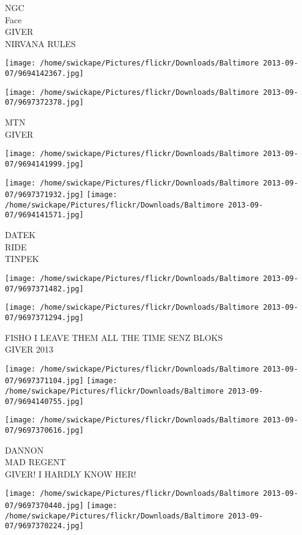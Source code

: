 \documentclass[10pt,letterpaper]{article}
\begin{document}
NGC\\
Face\\
GIVER\\
NIRVANA RULES
\pagebreak

\texttt{[image: /home/swickape/Pictures/flickr/Downloads/Baltimore 2013-09-07/9694142367.jpg]}

\vspace{0.25in}
\texttt{[image: /home/swickape/Pictures/flickr/Downloads/Baltimore 2013-09-07/9697372378.jpg]}

MTN\\
GIVER
\pagebreak

\texttt{[image: /home/swickape/Pictures/flickr/Downloads/Baltimore 2013-09-07/9694141999.jpg]}

\vspace{0.25in}
\texttt{[image: /home/swickape/Pictures/flickr/Downloads/Baltimore 2013-09-07/9697371932.jpg]}
\texttt{[image: /home/swickape/Pictures/flickr/Downloads/Baltimore 2013-09-07/9694141571.jpg]}

DATEK\\
RIDE\\
TINPEK
\pagebreak

\texttt{[image: /home/swickape/Pictures/flickr/Downloads/Baltimore 2013-09-07/9697371482.jpg]}

\vspace{0.25in}
\texttt{[image: /home/swickape/Pictures/flickr/Downloads/Baltimore 2013-09-07/9697371294.jpg]}

FISHO I LEAVE THEM ALL THE TIME SENZ BLOKS\\
GIVER 2013
\pagebreak

\texttt{[image: /home/swickape/Pictures/flickr/Downloads/Baltimore 2013-09-07/9697371104.jpg]}
\texttt{[image: /home/swickape/Pictures/flickr/Downloads/Baltimore 2013-09-07/9694140755.jpg]}

\vspace{0.25in}
\texttt{[image: /home/swickape/Pictures/flickr/Downloads/Baltimore 2013-09-07/9697370616.jpg]}

DANNON\\
MAD REGENT\\
GIVER!  I HARDLY KNOW HER!
\pagebreak

\texttt{[image: /home/swickape/Pictures/flickr/Downloads/Baltimore 2013-09-07/9697370440.jpg]}
\texttt{[image: /home/swickape/Pictures/flickr/Downloads/Baltimore 2013-09-07/9697370224.jpg]}
\end{document}
